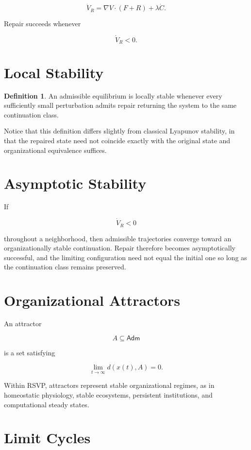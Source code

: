 \documentclass[11pt,oneside]{book}
\numberwithin{equation}{chapter}
\theoremstyle{definition}
\newtheorem{definition}{Definition}[chapter]
\theoremstyle{plain}
\newcommand{\Adm}{\mathsf{Adm}}
\begin{document}
\[
\dot V_R
=
\nabla V
\cdot
(F+R)
+
\lambda
\dot C.
\]

Repair succeeds whenever

\[
\dot V_R
<
0.
\]

\section{Local Stability}

\begin{definition}
An admissible equilibrium is locally stable whenever every sufficiently
small perturbation admits repair returning the system to the same
continuation class.
\end{definition}

Notice that this definition differs slightly from classical Lyapunov stability, in that the repaired state need not coincide exactly with the original state and organizational equivalence suffices.

\section{Asymptotic Stability}

If

\[
\dot V_R
<
0
\]

throughout a neighborhood, then admissible trajectories converge toward an organizationally stable continuation. Repair therefore becomes asymptotically successful, and the limiting configuration need not equal the initial one so long as the continuation class remains preserved.

\section{Organizational Attractors}

An attractor

\[
A
\subseteq
\Adm
\]

is a set satisfying

\[
\lim_{t\rightarrow\infty}
d(x(t),A)
=
0.
\]

Within RSVP, attractors represent stable organizational regimes, as in homeostatic physiology, stable ecosystems, persistent institutions, and computational steady states.

\section{Limit Cycles}
\end{document}
